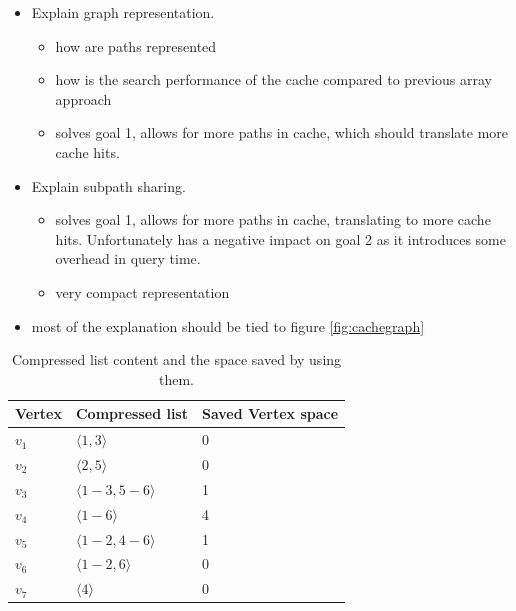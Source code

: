 \begin{itemize}
\item Explain graph representation.
    \begin{itemize}
    \item how are paths represented
    \item how is the search performance of the cache compared to previous array approach
    \item solves goal 1, allows for more paths in cache, which should translate more cache hits.
    \end{itemize}
\item Explain subpath sharing.
    \begin{itemize}
    \item solves goal 1, allows for more paths in cache, translating to more cache hits. Unfortunately has a negative impact on goal 2 as it introduces some overhead in query time.
    \item very compact representation
    \end{itemize}
\item most of the explanation should be tied to figure \ref{fig:cachegraph}
\end{itemize}

\begin{table}
\center
\begin{tabular}{|l|l|l|}\hline
Vertex 	& Compressed list & Saved Vertex space \\\hline
$v_1$ 	& $\langle 1, 3 \rangle$ 	& 0 \\\hline
$v_2$ 	& $\langle2, 5 \rangle$ 	& 0 \\\hline
$v_3$ 	& $\langle 1-3, 5-6 \rangle$ 	& 1 \\\hline
$v_4$ 	& $\langle 1-6 \rangle$ 	& 4 \\\hline
$v_5$ 	& $\langle 1-2, 4-6 \rangle$ 	& 1 \\\hline
$v_6$ 	& $\langle 1-2, 6 \rangle$ 	& 0 \\\hline
$v_7$ 	& $\langle 4 \rangle$ 		& 0 \\\hline

\end{tabular}
\caption{Compressed list content and the space saved by using them.}
\label{tab:compressedlist}
\end{table}
